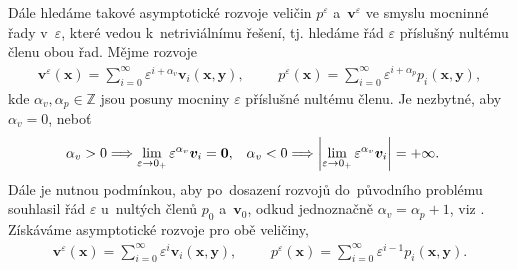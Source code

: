 Dále hledáme takové asymptotické rozvoje veličin $p^{\varepsilon}$ a~$\bm{v}^\varepsilon$ ve smyslu mocninné řady v~$\varepsilon$, které vedou k~netriviálnímu řešení, tj. hledáme řád $\varepsilon$ příslušný nultému členu obou řad. Mějme rozvoje
\begin{align}\label{eq:stokes_asymptotic}
    \bm{v}^{\varepsilon}(\bm{x})=\sum_{i=0}^\infty \varepsilon^{i+\alpha_v}\bm{v}_i(\bm{x},\bm{y}),
    &&&
    p^{\varepsilon}(\bm{x})=\sum_{i=0}^\infty \varepsilon^{i+\alpha_p}p_i(\bm{x},\bm{y}),
\end{align}
kde $\alpha_v, \alpha_p\in\mathbb{Z}$ jsou posuny mocniny $\varepsilon$ příslušné nultému členu. Je nezbytné, aby $\alpha_v=0$, neboť
\begin{align}
        \alpha_v>0\Longrightarrow \lim_{\varepsilon\to0_+}\varepsilon^{\alpha_v}\bm{v}_i = \bm{0},
    &&&
        \alpha_v < 0 \Longrightarrow \left\lvert\lim_{\varepsilon\to0_+}\varepsilon^{\alpha_v}\bm{v}_i\right\rvert=+\infty.
\end{align}
Dále je nutnou podmínkou, aby po~dosazení rozvojů do~původního problému souhlasil řád $\varepsilon$ u~nultých členů $p_0$ a~$\bm{v}_0$, odkud jednoznačně $\alpha_v=\alpha_p+1$, viz . Získáváme asymptotické rozvoje pro obě veličiny, 
\begin{align}
        \bm{v}^{\varepsilon}(\bm{x})=\sum_{i=0}^\infty \varepsilon^{i}\bm{v}_i(\bm{x},\bm{y}),
        &&&
        p^{\varepsilon}(\bm{x})=\sum_{i=0}^\infty \varepsilon^{i-1}p_i(\bm{x},\bm{y}).
\end{align}

